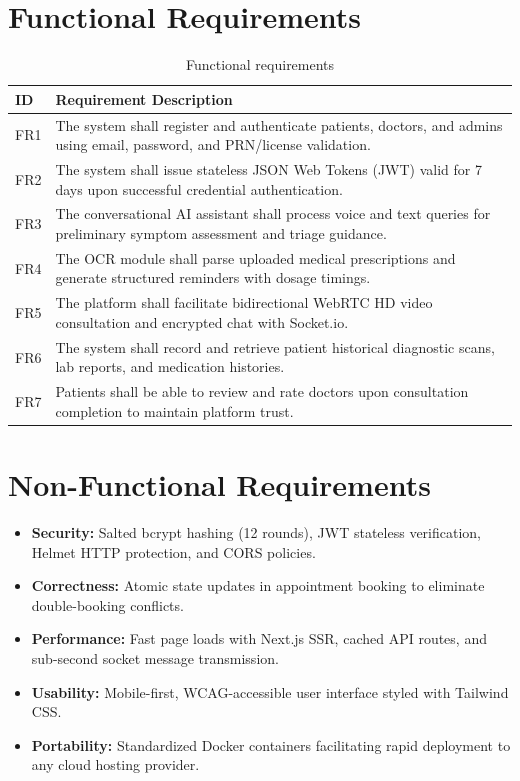 \documentclass[12pt,a4paper]{report}
\begin{document}
\section{Functional Requirements}
\begin{table}[htbp]
\centering
\caption{Functional requirements}
\label{tab:func_req}
\begin{tabularx}{\textwidth}{p{1.8cm} X}
\toprule
\textbf{ID} & \textbf{Requirement Description} \\
\midrule
FR1 & The system shall register and authenticate patients, doctors, and admins using email, password, and PRN/license validation. \\
FR2 & The system shall issue stateless JSON Web Tokens (JWT) valid for 7 days upon successful credential authentication. \\
FR3 & The conversational AI assistant shall process voice and text queries for preliminary symptom assessment and triage guidance. \\
FR4 & The OCR module shall parse uploaded medical prescriptions and generate structured reminders with dosage timings. \\
FR5 & The platform shall facilitate bidirectional WebRTC HD video consultation and encrypted chat with Socket.io. \\
FR6 & The system shall record and retrieve patient historical diagnostic scans, lab reports, and medication histories. \\
FR7 & Patients shall be able to review and rate doctors upon consultation completion to maintain platform trust. \\
\bottomrule
\end{tabularx}
\end{table}

\section{Non-Functional Requirements}
\begin{itemize}[leftmargin=1.5cm]
    \item \textbf{Security:} Salted bcrypt hashing (12 rounds), JWT stateless verification, Helmet HTTP protection, and CORS policies.
    \item \textbf{Correctness:} Atomic state updates in appointment booking to eliminate double-booking conflicts.
    \item \textbf{Performance:} Fast page loads with Next.js SSR, cached API routes, and sub-second socket message transmission.
    \item \textbf{Usability:} Mobile-first, WCAG-accessible user interface styled with Tailwind CSS.
    \item \textbf{Portability:} Standardized Docker containers facilitating rapid deployment to any cloud hosting provider.
\end{itemize}
\end{document}
